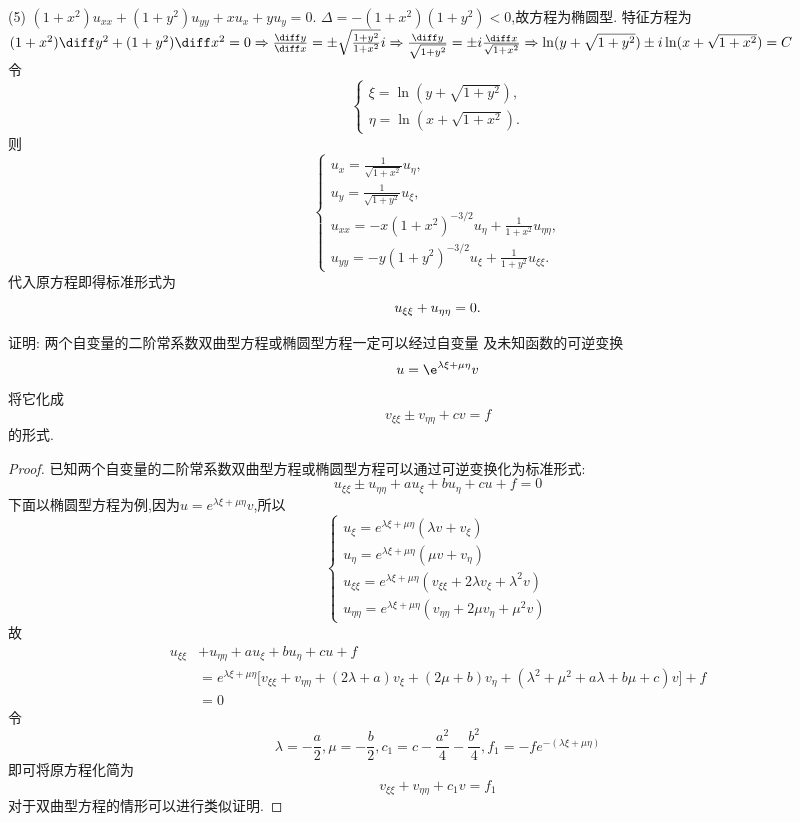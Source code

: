 \begin{solve}
  (5) $(1+x^2)u_{xx}+(1+y^2)u_{yy}+xu_x+yu_y=0$.
  $\Delta=-(1+x^2)(1+y^2)<0$,故方程为椭圆型.
  特征方程为$(1+x^2)\diff y^2+(1+y^2)\diff x^2=0\Rightarrow\frac{\diff y}{\diff x}=\pm\sqrt{\frac{1+y^2}{1+x^2}}i\Rightarrow\frac{\diff y}{\sqrt{1+y^2}}=\pm i\frac{\diff x}{\sqrt{1+x^2}}\Rightarrow\ln(y+\sqrt{1+y^2})\pm i\ln(x+\sqrt{1+x^2})=C$\\
  令
  \[\begin{cases}
  \xi = \ln(y+\sqrt{1+y^2}), \\
  \eta=\ln(x+\sqrt{1+x^2}).
  \end{cases}\]
  则
  \[\begin{cases}
    u_x = \frac{1}{\sqrt{1+x^2}}u_{\eta}, \\
    u_y = \frac{1}{\sqrt{1+y^2}}u_{\xi}, \\
    u_{xx} = -x(1+x^2)^{-3/2}u_{\eta}+\frac{1}{1+x^2}u_{\eta\eta}, \\
    u_{yy} = -y(1+y^2)^{-3/2}u_{\xi}+\frac{1}{1+y^2}u_{\xi\xi}.
  \end{cases}\]
  代入原方程即得标准形式为
  \[u_{\xi\xi}+u_{\eta\eta}=0. \qedhere\]
\end{solve}


\begin{exercise}
  证明: 两个自变量的二阶常系数双曲型方程或椭圆型方程一定可以经过自变量
  及未知函数的可逆变换
  \[u = \e^{\lambda\xi + \mu\eta} v\]
  将它化成
  \[v_{\xi\xi} \pm v_{\eta\eta} + cv = f\]
  的形式.
\end{exercise}

\begin{proof}
  已知两个自变量的二阶常系数双曲型方程或椭圆型方程可以通过可逆变换化为标准形式:
  \[u_{\xi\xi}\pm u_{\eta\eta}+au_{\xi}+bu_{\eta}+cu+f=0\]
  下面以椭圆型方程为例,因为$u=e^{\lambda\xi+\mu\eta}v$,所以
  \[\begin{cases}
  u_{\xi}=e^{\lambda\xi+\mu\eta}(\lambda v+v_{\xi})\\
  u_{\eta}=e^{\lambda\xi+\mu\eta}(\mu v+v_{\eta})\\
  u_{\xi\xi}=e^{\lambda\xi+\mu\eta}(v_{\xi\xi}+2\lambda v_{\xi}+\lambda^2v)\\
  u_{\eta\eta}=e^{\lambda\xi+\mu\eta}(v_{\eta\eta}+2\mu v_{\eta}+\mu^2v)
  \end{cases}\]
  故
  \[\begin{split}
  u_{\xi\xi}&+u_{\eta\eta}+au_{\xi}+bu_{\eta}+cu+f\\
  &=e^{\lambda\xi+\mu\eta}\big[v_{\xi\xi}+v_{\eta\eta}+(2\lambda+a)v_{\xi}+(2\mu+b)v_{\eta}+(\lambda^2+\mu^2+a\lambda+b\mu+c)v\big]+f\\
  &=0
  \end{split}\]
  令\[\lambda=-\frac{a}{2},\mu=-\frac{b}{2},c_1=c-\frac{a^2}{4}-\frac{b^2}{4},f_1=-fe^{-(\lambda\xi+\mu\eta)}\]
  即可将原方程化简为
  \[v_{\xi\xi}+v_{\eta\eta}+c_1v=f_1\]
  对于双曲型方程的情形可以进行类似证明.
\end{proof}



